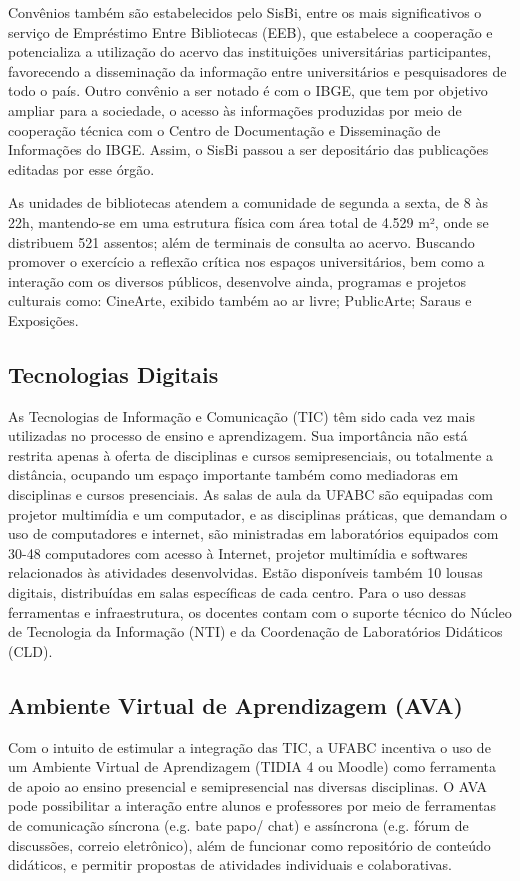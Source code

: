 Convênios também são estabelecidos pelo SisBi, entre os mais significativos o serviço de Empréstimo Entre Bibliotecas (EEB), que estabelece a cooperação e potencializa a utilização do acervo das instituições universitárias participantes, favorecendo a disseminação da informação entre universitários e pesquisadores de todo o país. Outro convênio a ser notado é com o IBGE, que tem por objetivo ampliar para a sociedade, o acesso às informações produzidas por meio de cooperação técnica com o Centro de Documentação e Disseminação de Informações do IBGE. Assim, o SisBi passou a ser depositário das publicações editadas por esse órgão.

As unidades de bibliotecas atendem a comunidade de segunda a sexta, de 8 às 22h, mantendo-se em uma estrutura física com área total de 4.529 m², onde se distribuem 521 assentos; além de terminais de consulta ao acervo. Buscando promover o exercício a reflexão crítica nos espaços universitários, bem como a interação com os diversos públicos, desenvolve ainda, programas e projetos culturais como: CineArte, exibido também ao ar livre; PublicArte; Saraus e Exposições.

\subsection{Tecnologias Digitais}

As Tecnologias de Informação e Comunicação (TIC) têm sido cada vez mais utilizadas no processo de ensino e aprendizagem. Sua importância não está restrita apenas à oferta de disciplinas e cursos semipresenciais, ou totalmente a distância, ocupando um espaço importante também como mediadoras em disciplinas e cursos presenciais.
As salas de aula da UFABC são equipadas com projetor multimídia e um computador, e as disciplinas práticas, que demandam o uso de computadores e internet, são ministradas em laboratórios equipados com 30-48 computadores com acesso à Internet, projetor multimídia e softwares relacionados às atividades desenvolvidas. Estão disponíveis também 10 lousas digitais, distribuídas em salas específicas de cada centro. Para o uso dessas ferramentas e infraestrutura, os docentes contam com o suporte técnico do Núcleo de Tecnologia da Informação (NTI) e da Coordenação de Laboratórios Didáticos (CLD).

\subsection{Ambiente Virtual de Aprendizagem (AVA)}
Com o intuito de estimular a integração das TIC, a UFABC incentiva o uso de um Ambiente Virtual de Aprendizagem (TIDIA 4 ou Moodle) como ferramenta de apoio ao ensino presencial e semipresencial nas diversas disciplinas. O AVA pode possibilitar a interação entre alunos e professores por meio de ferramentas de comunicação síncrona (e.g. bate papo/ chat) e assíncrona (e.g. fórum de discussões, correio eletrônico), além de funcionar como repositório de conteúdo didáticos, e permitir propostas de atividades individuais e colaborativas.

